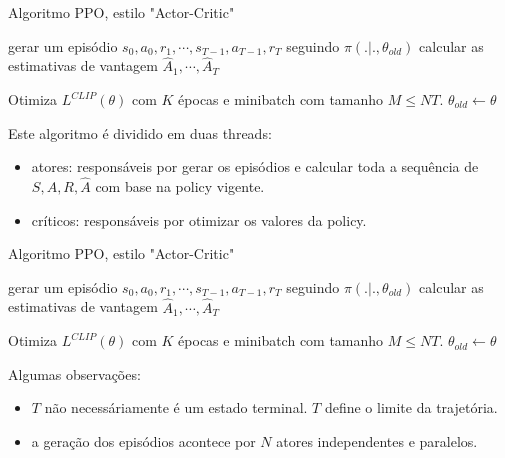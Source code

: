 \documentclass{beamer}
\begin{document}
\begin{frame}{Algoritmo PPO, estilo "Actor-Critic"}
	
	\begin{algorithmic} 
		\STATE \TA gerar um episódio ${s_{0},a_{0},r_{1},\cdots,s_{T-1},a_{T-1},r_{T}}$ seguindo $\pi(.|.,\theta_{old})$
		\STATE \TA calcular as estimativas de vantagem $\hat{A}_{1}, \cdots, \hat{A}_{T}$
		\ENDFOR
		
		\STATE \TB Otimiza $L^{CLIP}(\theta)$ com $K$ épocas e minibatch com tamanho $M \leq NT$. 
		\STATE \TB $\theta_{old} \leftarrow \theta$
		
		\ENDFOR
	\end{algorithmic}	

Este algoritmo é dividido em duas threads: 

\begin{itemize}
	\item atores: responsáveis por gerar os episódios e calcular toda a sequência de $S, A, R, \hat{A}$ com base na policy vigente.
	\item críticos: responsáveis por otimizar os valores da policy. 
\end{itemize}
	
\end{frame}


\begin{frame}{Algoritmo PPO, estilo "Actor-Critic"}
	
	\begin{algorithmic} 
		\FOR {iterações=1,2,$\cdots$}
		\FOR {actor=1,2,$\cdots$, N}
		\STATE \TA gerar um episódio ${s_{0},a_{0},r_{1},\cdots,s_{T-1},a_{T-1},r_{T}}$ seguindo $\pi(.|.,\theta_{old})$
		\STATE \TA calcular as estimativas de vantagem $\hat{A}_{1}, \cdots, \hat{A}_{T}$
		\ENDFOR
		
		\STATE Otimiza $L^{CLIP}(\theta)$ com $K$ épocas e minibatch com tamanho $M \leq NT$. 
		\STATE $\theta_{old} \leftarrow \theta$
		
		\ENDFOR
	\end{algorithmic}	
	
	Algumas observações: 
	
	\begin{itemize}
		\item $T$ não necessáriamente é um estado terminal. $T$ define o limite da trajetória. 
		\item a geração dos episódios acontece por $N$ atores independentes e paralelos.
	\end{itemize}
	
\end{frame}
\end{document}
